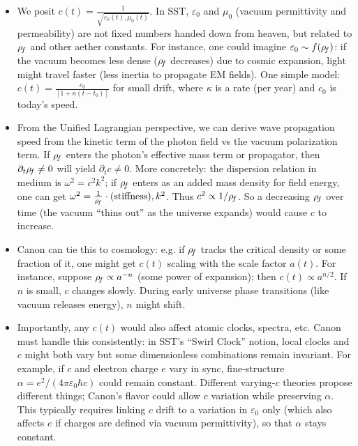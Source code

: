 \documentclass[11pt]{article}
\begin{document}
\begin{itemize}

\item 
We posit $c(t) = \frac{1}{\sqrt{\varepsilon_0(t),\mu_0(t)}}$. In SST, $\varepsilon_0$ and $\mu_0$ (vacuum permittivity and permeability) are not fixed numbers handed down from heaven, but related to $\rho_{\!f}$ and other aether constants. For instance, one could imagine $\varepsilon_0 \sim f(\rho_{\!f})$: if the vacuum becomes less dense ($\rho_{\!f}$ decreases) due to cosmic expansion, light might travel faster (less inertia to propagate EM fields). One simple model: $c(t) = \frac{c_0}{[1 + \kappa (t - t_0)]}$ for small drift, where $\kappa$ is a rate (per year) and $c_0$ is today’s speed.




\item 
From the Unified Lagrangian perspective, we can derive wave propagation speed from the kinetic term of the photon field vs the vacuum polarization term. If $\rho_{\!f}$ enters the photon’s effective mass term or propagator, then $\partial_t \rho_{\!f} \neq 0$ will yield $\partial_t c \neq 0$. More concretely: the dispersion relation in medium is $\omega^2 = c^2 k^2$; if $\rho_{\!f}$ enters as an added mass density for field energy, one can get $\omega^2 = \frac{1}{\rho_{\!f}}\cdot (\text{stiffness}),k^2$. Thus $c^2 \propto 1/\rho_{\!f}$. So a decreasing $\rho_{\!f}$ over time (the vacuum “thins out” as the universe expands) would cause $c$ to increase.




\item 
Canon can tie this to cosmology: e.g. if $\rho_{\!f}$ tracks the critical density or some fraction of it, one might get $c(t)$ scaling with the scale factor $a(t)$. For instance, suppose $\rho_{\!f} \propto a^{-n}$ (some power of expansion); then $c(t) \propto a^{n/2}$. If $n$ is small, $c$ changes slowly. During early universe phase transitions (like vacuum releases energy), $n$ might shift.




\item 
Importantly, any $c(t)$ would also affect atomic clocks, spectra, etc. Canon must handle this consistently: in SST’s “Swirl Clock” notion, local clocks and $c$ might both vary but some dimensionless combinations remain invariant. For example, if $c$ and electron charge $e$ vary in sync, fine-structure $\alpha = e^2/(4\pi \varepsilon_0 \hbar c)$ could remain constant. Different varying-$c$ theories propose different things; Canon’s flavor could allow $c$ variation while preserving $\alpha$. This typically requires linking $c$ drift to a variation in $\varepsilon_0$ only (which also affects $e$ if charges are defined via vacuum permittivity), so that $\alpha$ stays constant.





\end{itemize}
\end{document}

